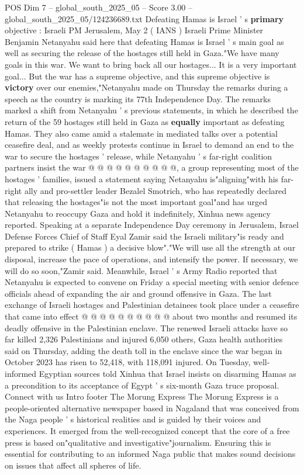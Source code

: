 \begin{textsample}{POS Dim 7 – global\_south\_2025\_05 – Score 3.00 – global\_south\_2025\_05/124236689.txt}  \label{ex:f7_pos_438}
Defeating Hamas is Israel ' s \textbf{primary} objective : Israeli PM Jerusalem, May 2 ( IANS ) Israeli Prime Minister Benjamin Netanyahu said here that defeating Hamas is Israel ' s main goal as well as securing the release of the hostages still held in Gaza."We have many goals in this war.
We want to bring back all our hostages...
It is a very important goal...
But the war has a supreme objective, and this supreme objective is \textbf{victory} over our enemies,"Netanyahu made on Thursday the remarks during a speech as the country is marking its 77th Independence Day.
The remarks marked a shift from Netanyahu ' s previous statements, in which he described the return of the 59 hostages still held in Gaza as \textbf{equally} important as defeating Hamas.
They also came amid a stalemate in mediated talks over a potential ceasefire deal, and as weekly protests continue in Israel to demand an end to the war to secure the hostages ' release, while Netanyahu ' s far-right coalition partners insist the war @ @ @ @ @ @ @ @ @ @, a group representing most of the hostages ' families, issued a statement saying Netanyahu is"aligning"with his far-right ally and pro-settler leader Bezalel Smotrich, who has repeatedly declared that releasing the hostages"is not the most important goal"and has urged Netanyahu to reoccupy Gaza and hold it indefinitely, Xinhua news agency reported.
Speaking at a separate Independence Day ceremony in Jerusalem, Israel Defense Forces Chief of Staff Eyal Zamir said the Israeli military"is ready and prepared to strike ( Hamas ) a decisive blow"."We will use all the strength at our disposal, increase the pace of operations, and intensify the power.
If necessary, we will do so soon,"Zamir said.
Meanwhile, Israel ' s Army Radio reported that Netanyahu is expected to convene on Friday a special meeting with senior defence officials ahead of expanding the air and ground offensive in Gaza.
The last exchange of Israeli hostages and Palestinian detainees took place under a ceasefire that came into effect @ @ @ @ @ @ @ @ @ @ about two months and resumed its deadly offensive in the Palestinian enclave.
The renewed Israeli attacks have so far killed 2,326 Palestinians and injured 6,050 others, Gaza health authorities said on Thursday, adding the death toll in the enclave since the war began in October 2023 has risen to 52,418, with 118,091 injured.
On Tuesday, well-informed Egyptian sources told Xinhua that Israel insists on disarming Hamas as a precondition to its acceptance of Egypt ' s six-month Gaza truce proposal.
Connect with us Intro footer The Morung Express The Morung Express is a people-oriented alternative newspaper based in Nagaland that was conceived from the Naga people ' s historical realities and is guided by their voices and experiences.
It emerged from the well-recognized concept that the core of a free press is based on"qualitative and investigative"journalism.
Ensuring this is essential for contributing to an informed Naga public that makes sound decisions on issues that affect all spheres of life.

\end{textsample}
